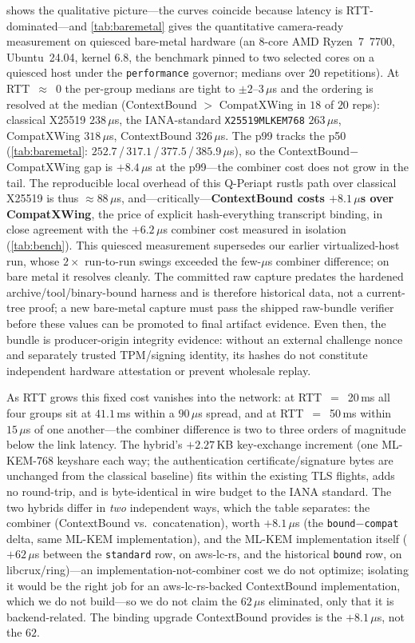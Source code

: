\documentclass[journal]{IEEEtran}
\newcommand{\code}[1]{\texttt{\small #1}}
\begin{document}
 shows the qualitative picture---the curves coincide because latency is
RTT-dominated---and \cref{tab:baremetal} gives the quantitative camera-ready measurement on quiesced
bare-metal hardware (an 8-core AMD Ryzen~7~7700, Ubuntu~24.04, kernel 6.8, the benchmark pinned to
two selected cores on a quiesced host under the \code{performance} governor; medians over $20$
repetitions). At
RTT~$\approx$~0 the per-group medians are tight to $\pm 2$--$3\,\mu$s and the ordering is resolved at
the median (ContextBound $>$ CompatXWing in $18$ of $20$ reps): classical X25519 $238\,\mu$s, the
IANA-standard \code{X25519MLKEM768} $263\,\mu$s, CompatXWing $318\,\mu$s, ContextBound $326\,\mu$s.
The p99 tracks the p50 (\cref{tab:baremetal}: $252.7$\,/\,$317.1$\,/\,$377.5$\,/\,$385.9\,\mu$s), so
the ContextBound$-$CompatXWing gap is $+8.4\,\mu$s at the p99---the combiner cost does not grow in
the tail.
The reproducible local overhead of this Q-Periapt rustls path over classical X25519 is thus
$\approx 88\,\mu$s, and---critically---\textbf{ContextBound costs $+8.1\,\mu$s over CompatXWing},
the price of explicit hash-everything transcript binding, in close agreement with the $+6.2\,\mu$s combiner cost
measured in isolation (\cref{tab:bench}). This
quiesced measurement supersedes our earlier virtualized-host run, whose $2\times$ run-to-run swings
exceeded the few-$\mu$s combiner difference; on bare metal it resolves cleanly. The committed raw
capture predates the hardened archive/tool/binary-bound harness and is therefore historical data,
not a current-tree proof; a new bare-metal capture must pass the shipped raw-bundle verifier before
these values can be promoted to final artifact evidence. Even then, the bundle is producer-origin
integrity evidence: without an external challenge nonce and separately trusted TPM/signing identity,
its hashes do not constitute independent hardware attestation or prevent wholesale replay.

As RTT grows this fixed cost vanishes into the network: at RTT~$=$~20\,ms all four groups sit at
$41.1$\,ms within a $90\,\mu$s spread, and at RTT~$=$~50\,ms within $15\,\mu$s of one
another---the combiner difference is two to three orders of magnitude below the link latency. The
hybrid's $+2.27$\,KB key-exchange increment (one ML-KEM-768 keyshare each way; the authentication
certificate/signature bytes are unchanged from the classical baseline) fits within the existing TLS
flights, adds no round-trip, and is byte-identical in wire budget to the IANA standard. The two hybrids differ in \emph{two} independent ways, which the table separates: the
combiner (ContextBound vs.\ concatenation), worth $+8.1\,\mu$s (the \code{bound}$-$\code{compat}
delta, same ML-KEM implementation), and the ML-KEM implementation itself ($+62\,\mu$s between the
\code{standard} row, on aws-lc-rs, and the historical \code{bound} row, on libcrux/ring)---an
implementation-not-combiner cost we do not optimize; isolating it would be the right job for an
aws-lc-rs-backed ContextBound implementation, which we do not build---so we do not claim the
$62\,\mu$s eliminated, only that it is backend-related. The binding upgrade ContextBound provides is
the $+8.1\,\mu$s, not the $62$.
\end{document}

